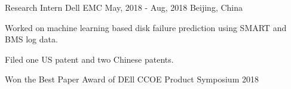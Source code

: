 \begin{cventries}
  \cventry
    {Research Intern} %
    {Dell EMC} %
    {May, 2018 - Aug, 2018} %
    {Beijing, China} %
    {
      \begin{cvitems} %
        \item {Worked on machine learning based disk failure prediction using SMART and BMS log data.}
        \item {Filed one US patent and two Chinese patents.}
        \item {Won the Best Paper Award of DEll CCOE Product Symposium 2018}
      \end{cvitems}
    }

\end{cventries}
